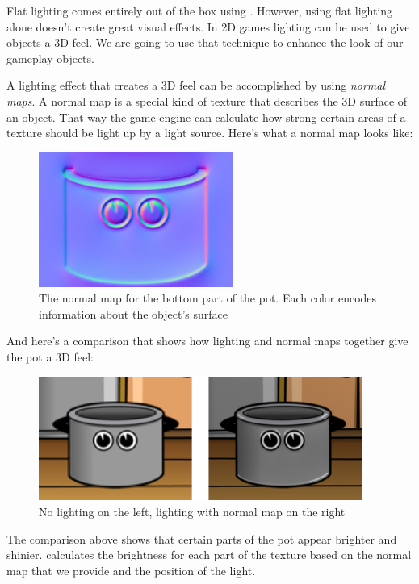 Flat lighting comes entirely out of the box using \cocos{}. However, using flat
lighting alone doesn't create great visual effects. In 2D games lighting can be
used to give objects a 3D feel. We are going to use that technique to enhance
the look of our gameplay objects.

A lighting effect that creates a 3D feel can be accomplished by using
\textit{normal maps}. A normal map is a special kind of texture that describes
the 3D surface of an object. That way the game engine can calculate how strong certain areas of a texture should
be light up by a light source. Here's what a normal map looks like:

\begin{figure}[H]
    \centering
    \includegraphics[width=180pt]{images/Chapter9/pot-bottom_NRM.png}
    \caption{The normal map for the bottom part of the pot. Each color encodes
    information about the object's surface}
\end{figure}

And here's a comparison that shows how lighting and normal maps together give
the pot a 3D feel:

\begin{figure}[H]
    \centering
    \includegraphics[width=300pt]{images/Chapter9/pot_lighting_comparison.png}
    \caption{No lighting on the left, lighting with normal map on the right}
\end{figure}

The comparison above shows that certain parts of the pot appear brighter and
shinier. \cocos{} calculates the brightness for each part of the texture based
on the normal map that we provide and the position of the light. 

